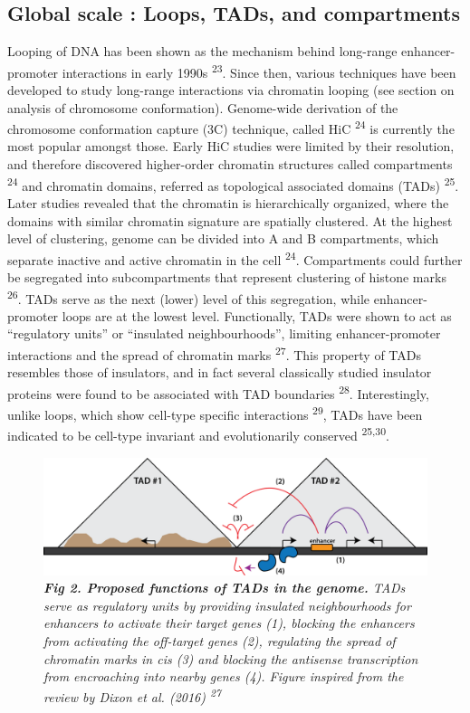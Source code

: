 \documentclass[11pt,twoside]{MPIthesis}
\theoremstyle{definition}
\theoremstyle{definition}
\theoremstyle{definition}
\theoremstyle{remark}
\begin{document}
\subsection{Global scale : Loops, TADs, and
compartments}\label{global-scale-loops-tads-and-compartments}

Looping of DNA has been shown as the mechanism behind long-range
enhancer-promoter interactions in early 1990s \textsuperscript{23}.
Since then, various techniques have been developed to study long-range
interactions via chromatin looping (see section on analysis of
chromosome conformation). Genome-wide derivation of the chromosome
conformation capture (3C) technique, called HiC \textsuperscript{24} is
currently the most popular amongst those. Early HiC studies were limited
by their resolution, and therefore discovered higher-order chromatin
structures called compartments \textsuperscript{24} and chromatin
domains, referred as topological associated domains (TADs)
\textsuperscript{25}. Later studies revealed that the chromatin is
hierarchically organized, where the domains with similar chromatin
signature are spatially clustered. At the highest level of clustering,
genome can be divided into A and B compartments, which separate inactive
and active chromatin in the cell \textsuperscript{24}. Compartments
could further be segregated into subcompartments that represent
clustering of histone marks \textsuperscript{26}. TADs serve as the next
(lower) level of this segregation, while enhancer-promoter loops are at
the lowest level. Functionally, TADs were shown to act as ``regulatory
units'' or ``insulated neighbourhoods'', limiting enhancer-promoter
interactions and the spread of chromatin marks \textsuperscript{27}.
This property of TADs resembles those of insulators, and in fact several
classically studied insulator proteins were found to be associated with
TAD boundaries \textsuperscript{28}. Interestingly, unlike loops, which
show cell-type specific interactions \textsuperscript{29}, TADs have
been indicated to be cell-type invariant and evolutionarily conserved
\textsuperscript{25,30}.
\begin{figure}

{\centering \includegraphics[width=0.8\linewidth]{figures/intro_fig2} 

}

\caption[Proposed functions of TADs in the genome]{\emph{\textbf{Fig 2. Proposed functions of TADs in the
genome.} TADs serve as regulatory units by providing insulated
neighbourhoods for enhancers to activate their target genes (1),
blocking the enhancers from activating the off-target genes (2),
regulating the spread of chromatin marks in cis (3) and blocking the
antisense transcription from encroaching into nearby genes (4). Figure
inspired from the review by Dixon et al. (2016) \textsuperscript{27}}}\label{fig:unnamed-chunk-2}
\end{figure}
\end{document}
